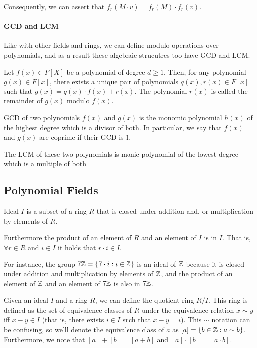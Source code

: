 Consequently, we can assert that $f_r(M\cdot v) = f_r(M)\cdot f_r(v)$.

\paragraph{GCD and LCM}

Like with other fields and rings, 
we can define modulo operations over polynomials, and as a result
these algebraic strucutres too have GCD and LCM.
\begin{definition}
    Let $f(x)\in F[X]$ be a polynomial of degree $d\ge 1$.
    Then, for any polynomial $g(x)\in F[x]$, there exists a unique 
    pair of polynomials $q(x),r(x)\in F[x]$ such that $g(x)=q(x)\cdot f(x) +r(x)$.
    The polynomial $r(x)$ is called the remainder of $g(x)$ modulo $f(x)$.
\end{definition}

\begin{definition}
    GCD of two polynomials $f(x)$ and $g(x)$ is the monomic polynomial $h(x)$
    of the highest degree which is a divisor of both.
    In particular, we say that $f(x)$ and $g(x)$ are coprime if their GCD is $1$.


    The LCM of these two polynomials is monic polynomial of the lowest 
    degree which is a multiple of both
\end{definition}


\subsection{Polynomial Fields}
\begin{definition}
    Ideal $I$ is a subset of a ring $R$ that is closed under addition and, or multiplication by elements of $R$.

    Furthermore the product of an element of $R$ and an element of $I$ is in $I$.
    That is, $\forall r\in R$ and $i\in I$ it holds that $r\cdot i\in I$.
\end{definition}

For instance, the group $7\mathbb{Z}=\{7\cdot i:i\in\mathbb{Z}\}$ is an ideal of $\mathbb{Z}$ because it is closed
under addition and multiplication by elements of $\mathbb{Z}$,
and the product of an element of $\mathbb{Z}$ and an element of $7\mathbb{Z}$ is also in $7\mathbb{Z}$.

Given an ideal $I$ and a ring $R$, we can define the quotient ring $R/I$.
This ring is defined as the set of equivalence classes of $R$ under the equivalence relation 
$x\sim y$ iff $x-y\in I$ (that is, there exists $i\in I$ such that $x-y=i$).
This $\sim$ notation can be confusing, so we'll denote the equivalence class of $a$ as $[a]=\{b\in \mathbb{Z} :a\sim b \}$.
Furthermore, we note that $[a]+[b]=[a+b]$ and $[a]\cdot[b]=[a\cdot b]$.

